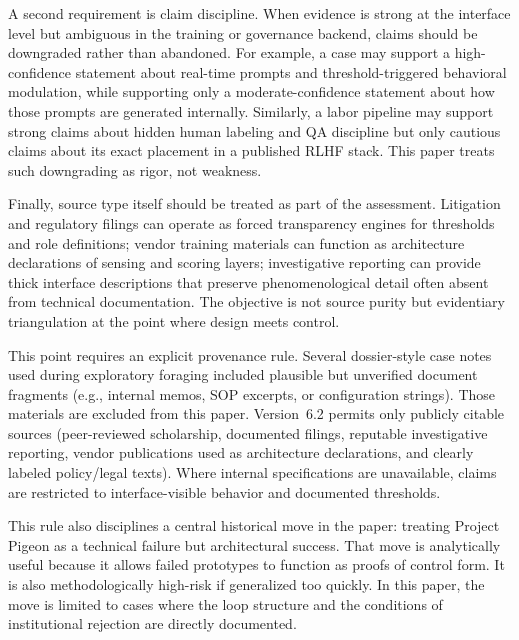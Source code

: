 \documentclass[runningheads]{llncs}
\begin{document}
A second requirement is claim discipline. When evidence is strong at the interface level but ambiguous in the training or governance backend, claims should be downgraded rather than abandoned. For example, a case may support a high-confidence statement about real-time prompts and threshold-triggered behavioral modulation, while supporting only a moderate-confidence statement about how those prompts are generated internally. Similarly, a labor pipeline may support strong claims about hidden human labeling and QA discipline but only cautious claims about its exact placement in a published RLHF stack. This paper treats such downgrading as rigor, not weakness.

Finally, source type itself should be treated as part of the assessment. Litigation and regulatory filings can operate as forced transparency engines for thresholds and role definitions; vendor training materials can function as architecture declarations of sensing and scoring layers; investigative reporting can provide thick interface descriptions that preserve phenomenological detail often absent from technical documentation. The objective is not source purity but evidentiary triangulation at the point where design meets control.

This point requires an explicit provenance rule. Several dossier-style case notes used during exploratory foraging included plausible but unverified document fragments (e.g., internal memos, SOP excerpts, or configuration strings). Those materials are excluded from this paper. Version~6.2 permits only publicly citable sources (peer-reviewed scholarship, documented filings, reputable investigative reporting, vendor publications used as architecture declarations, and clearly labeled policy/legal texts). Where internal specifications are unavailable, claims are restricted to interface-visible behavior and documented thresholds.

This rule also disciplines a central historical move in the paper: treating Project Pigeon as a technical failure but architectural success. That move is analytically useful because it allows failed prototypes to function as proofs of control form. It is also methodologically high-risk if generalized too quickly. In this paper, the move is limited to cases where the loop structure and the conditions of institutional rejection are directly documented.
\end{document}
